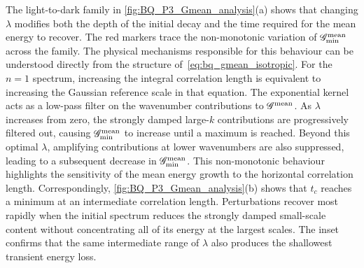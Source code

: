 The light-to-dark family in \cref{fig:BQ_P3_Gmean_analysis}(a) shows that changing
\(\lambda\) modifies both the depth of the initial decay and the time required for the mean energy
to recover. The red markers trace the non-monotonic variation of \(\mathscr{G}^{\mathrm{mean}}_{\min}\) across
the family. The physical mechanisms responsible for this behaviour can be
understood directly from the structure of~\eqref{eq:bq_gmean_isotropic}. For the \(n=1\) spectrum,
increasing the integral correlation length is equivalent to increasing the Gaussian reference scale
in that equation. The exponential kernel acts as a low-pass filter on the wavenumber contributions
to \(\mathscr{G}^{\mathrm{mean}}\). As \(\lambda\) increases from zero, the strongly damped
large-\(k\) contributions are progressively filtered out, causing \(\mathscr{G}^{\mathrm{mean}}_{\min}\) to increase until
a maximum is reached. Beyond this optimal \(\lambda\), amplifying contributions at lower
wavenumbers are also suppressed, leading to a subsequent decrease in \(\mathscr{G}^{\mathrm{mean}}_{\min}\). This
non-monotonic behaviour highlights the sensitivity of the mean energy growth to the horizontal
correlation length. Correspondingly, \cref{fig:BQ_P3_Gmean_analysis}(b) shows that \(t_c\) reaches
a minimum at an intermediate correlation length. Perturbations recover most rapidly when the initial
spectrum reduces the strongly damped small-scale content without concentrating all of its energy
at the largest scales. The inset confirms that the same intermediate range of \(\lambda\) also
produces the shallowest transient energy loss.

